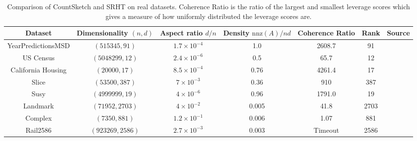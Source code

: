 \documentclass[twoside]{article}
\newcommand{\nnz}[1]{\text{nnz}(#1)}
\theoremstyle{definition}\newtheorem{thm}{Theorem}[section]
\theoremstyle{definition}\newtheorem{mydef}[thm]{Definition}
\theoremstyle{definition}\newtheorem{rem}[thm]{Remark}
\theoremstyle{definition}\newtheorem{prop}[thm]{Proposition}
\theoremstyle{definition}\newtheorem{example}[thm]{Example}
\theoremstyle{definition}\newtheorem{claim}[thm]{Claim}
\theoremstyle{definition}\newtheorem{Qu}[thm]{Question}
\theoremstyle{definition}\newtheorem{Lemma}[thm]{Lemma}
\theoremstyle{definition}\newtheorem{Cor}[thm]{Corollary}
\theoremstyle{definition}\newtheorem{Fact}[]{Fact}
\begin{document}
\begin{table}[ht]
\centering
\begin{adjustbox}{width=1\textwidth}

\begin{tabular}{|c|c|c|c|c|c|c|}
  \hline
Dataset                   & Dimensionality  $(n,d)$      &   Aspect ratio $d/n$ & Density $\nnz{A}/nd$ &  Coherence Ratio & Rank & Source \\
\hline
YearPredictionsMSD       & $(515345,91)$         &   $1.7 \times 10^{-4} $      & 1.0                  &  2608.7                 &  91   &  \cite{Dua:2017}             \\
US Census                & $(5048299, 12)$         & $2.4 \times 10^{-6}$       &
0.5                 &    65.7           &  12 &  \cite{census2000}\\
California Housing       & $(20000, 17)$         &   $8.5 \times 10^{-4} $      &  0.76                 & 4261.4                 & 17    &   \cite{geron2017hands}      \\


  Slice                   & $(53500, 387)$         &   $7 \times 10^{-3} $      &  0.36                 &                          910                 & 387    &   \cite{Dua:2017}       \\


Susy            & $(4999999, 19)$         &   $4 \times 10^{-6} $      &  0.96                 & 1791.0                & 19    &   \cite{Dua:2017}       \\

Landmark        & $(71952, 2703)$         &   $4 \times 10^{-2} $      &  0.005                 & 41.8                & 2703    &   \cite{davis2011university}      \\

Complex       & $(7350, 881)$         &   $1.2 \times 10^{-1} $      &  0.006                 & 1.07                & 881    &   \cite{davis2011university}      \\


Rail2586                 & $(923269, 2586)$      &   $2.7 \times 10^{-3} $      &  0.003                &  Timeout                & 2586    &   \cite{davis2011university} \\
\hline
\end{tabular}
\end{adjustbox}
\caption{Comparison of CountSketch and SRHT on real datasets.
Coherence Ratio is the ratio of the largest and smallest leverage scores which
gives a measure of how uniformly distributed the leverage scores are.}
\label{table: data-facts}
\end{table}
\end{document}
